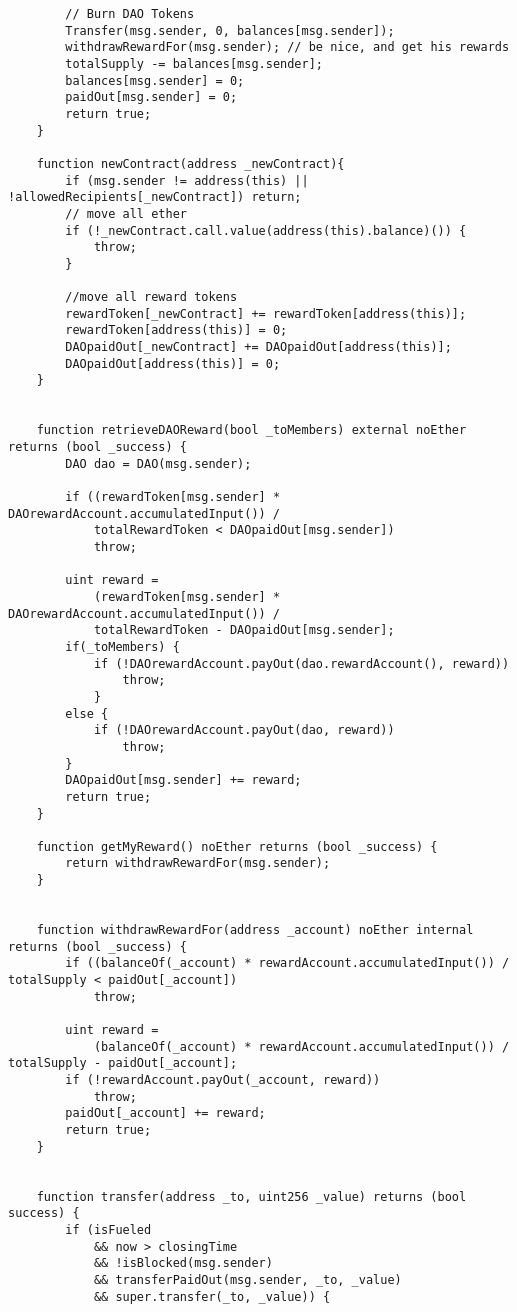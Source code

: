 \documentclass[9pt,oneside]{amsart}
\begin{document}
\begin{appendix}
\begin{verbatim}
        // Burn DAO Tokens
        Transfer(msg.sender, 0, balances[msg.sender]);
        withdrawRewardFor(msg.sender); // be nice, and get his rewards
        totalSupply -= balances[msg.sender];
        balances[msg.sender] = 0;
        paidOut[msg.sender] = 0;
        return true;
    }

    function newContract(address _newContract){
        if (msg.sender != address(this) || !allowedRecipients[_newContract]) return;
        // move all ether
        if (!_newContract.call.value(address(this).balance)()) {
            throw;
        }

        //move all reward tokens
        rewardToken[_newContract] += rewardToken[address(this)];
        rewardToken[address(this)] = 0;
        DAOpaidOut[_newContract] += DAOpaidOut[address(this)];
        DAOpaidOut[address(this)] = 0;
    }


    function retrieveDAOReward(bool _toMembers) external noEther returns (bool _success) {
        DAO dao = DAO(msg.sender);

        if ((rewardToken[msg.sender] * DAOrewardAccount.accumulatedInput()) /
            totalRewardToken < DAOpaidOut[msg.sender])
            throw;

        uint reward =
            (rewardToken[msg.sender] * DAOrewardAccount.accumulatedInput()) /
            totalRewardToken - DAOpaidOut[msg.sender];
        if(_toMembers) {
            if (!DAOrewardAccount.payOut(dao.rewardAccount(), reward))
                throw;
            }
        else {
            if (!DAOrewardAccount.payOut(dao, reward))
                throw;
        }
        DAOpaidOut[msg.sender] += reward;
        return true;
    }

    function getMyReward() noEther returns (bool _success) {
        return withdrawRewardFor(msg.sender);
    }


    function withdrawRewardFor(address _account) noEther internal returns (bool _success) {
        if ((balanceOf(_account) * rewardAccount.accumulatedInput()) / totalSupply < paidOut[_account])
            throw;

        uint reward =
            (balanceOf(_account) * rewardAccount.accumulatedInput()) / totalSupply - paidOut[_account];
        if (!rewardAccount.payOut(_account, reward))
            throw;
        paidOut[_account] += reward;
        return true;
    }


    function transfer(address _to, uint256 _value) returns (bool success) {
        if (isFueled
            && now > closingTime
            && !isBlocked(msg.sender)
            && transferPaidOut(msg.sender, _to, _value)
            && super.transfer(_to, _value)) {


\end{verbatim}
\end{appendix}
\end{document}

